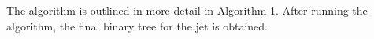\documentclass[12pt]{article}
\newcommand{\bea}{\begin{eqnarray}\begin{aligned}}
\newcommand{\eea}{\end{aligned}\end{eqnarray}}
\begin{document}
%
%
%
%
%
%
%
%
%
%

The algorithm is outlined in more detail in Algorithm 1. After running the algorithm, the final binary tree for the jet is obtained.
\end{document}
